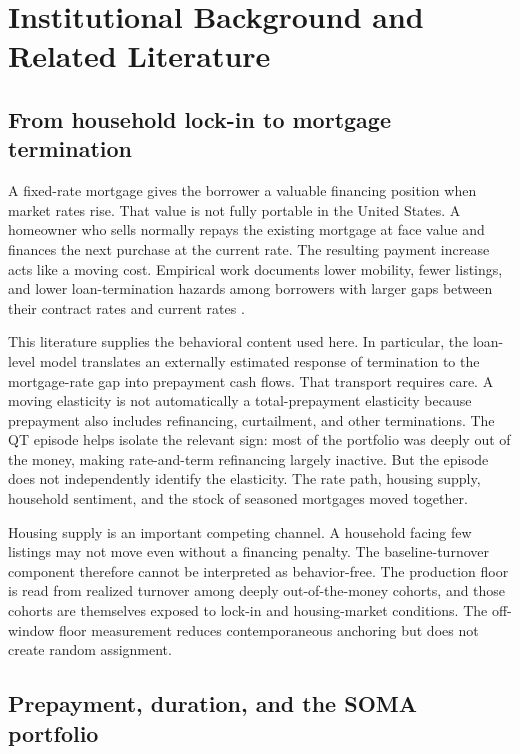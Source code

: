 \section{Institutional Background and Related Literature}\label{sec:setting}\label{sec:lit}

\subsection{From household lock-in to mortgage termination}

A fixed-rate mortgage gives the borrower a valuable financing position when market rates rise. That value is not fully portable in the United States. A homeowner who sells normally repays the existing mortgage at face value and finances the next purchase at the current rate. The resulting payment increase acts like a moving cost. Empirical work documents lower mobility, fewer listings, and lower loan-termination hazards among borrowers with larger gaps between their contract rates and current rates \citep{berger2021,eichenbaum2022,liebersohn2024,batzer2024,fonseca2024}.

This literature supplies the behavioral content used here. In particular, the loan-level model translates an externally estimated response of termination to the mortgage-rate gap into prepayment cash flows. That transport requires care. A moving elasticity is not automatically a total-prepayment elasticity because prepayment also includes refinancing, curtailment, and other terminations. The QT episode helps isolate the relevant sign: most of the portfolio was deeply out of the money, making rate-and-term refinancing largely inactive. But the episode does not independently identify the elasticity. The rate path, housing supply, household sentiment, and the stock of seasoned mortgages moved together.

Housing supply is an important competing channel. A household facing few listings may not move even without a financing penalty. The baseline-turnover component therefore cannot be interpreted as behavior-free. The production floor is read from realized turnover among deeply out-of-the-money cohorts, and those cohorts are themselves exposed to lock-in and housing-market conditions. The off-window floor measurement reduces contemporaneous anchoring but does not create random assignment.

\subsection{Prepayment, duration, and the SOMA portfolio}

